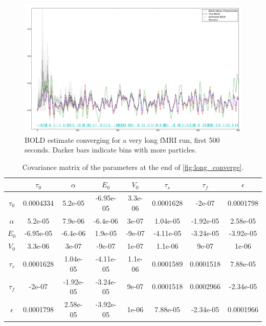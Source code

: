 \begin{figure}
\centering
\includegraphics[clip=true,trim=1cm 0cm 0cm 0cm, width=17cm]{images/long_converge_500}
\caption{\ac{BOLD} estimate converging for a very long \ac{fMRI} run, first 500 seconds. Darker bars
indicate bins with more particles.}
\label{fig:long_converge_500}
\end{figure}

\begin{table}[t]
\begin{tabular}{|c | c  c  c  c  c  c  c |}
\hline
  & $\tau_0$ & $\alpha$ & $E_0$    & $V_0$    & $\tau_s$ & $\tau_f$ & $\epsilon$ \\
\hline
\rowcolor[gray]{.8} $\tau_0$  & 0.0004334 & 5.2e-05 & -6.95e-05 & 3.3e-06 & 0.0001628 & -2e-07 & 0.0001798 \\
$\alpha$                      & 5.2e-05 & 7.9e-06 & -6.4e-06 & 3e-07 & 1.04e-05 & -1.92e-05 & 2.58e-05 \\
\rowcolor[gray]{.8} $E_0$     & -6.95e-05 & -6.4e-06 & 1.9e-05 & -9e-07 & -4.11e-05 & -3.24e-05 & -3.92e-05 \\
$V_0$                         & 3.3e-06 & 3e-07 & -9e-07 & 1e-07 & 1.1e-06 & 9e-07 & 1e-06 \\
\rowcolor[gray]{.8} $\tau_s$  & 0.0001628 & 1.04e-05 & -4.11e-05 & 1.1e-06 & 0.0001589 & 0.0001518 & 7.88e-05 \\
$\tau_f$                      & -2e-07 & -1.92e-05 & -3.24e-05 & 9e-07 & 0.0001518 & 0.0002966 & -2.34e-05 \\
\rowcolor[gray]{.8} $\epsilon$& 0.0001798 & 2.58e-05 & -3.92e-05 & 1e-06 & 7.88e-05 & -2.34e-05 & 0.0001966 \\
\hline
\end{tabular}
\caption{Covariance matrix of the parameters at the end of \autoref{fig:long_converge}.}
\label{tab:long_cov}
\end{table}

